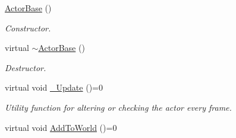 \begin{DoxyCompactItemize}
\item 
\hyperlink{classMezzanine_1_1ActorBase_aa9cc2fce1ff708a96d4a879b87054f18}{Actor\-Base} ()
\begin{DoxyCompactList}\small\item\em Constructor. \end{DoxyCompactList}\item 
virtual \hyperlink{classMezzanine_1_1ActorBase_a0b49f2bc589504c908ccc47a635e1e79}{$\sim$\-Actor\-Base} ()
\begin{DoxyCompactList}\small\item\em Destructor. \end{DoxyCompactList}\item 
virtual void \hyperlink{classMezzanine_1_1ActorBase_a8f5a36a6981f1249dbabab318531afd0}{\-\_\-\-Update} ()=0
\begin{DoxyCompactList}\small\item\em Utility function for altering or checking the actor every frame. \end{DoxyCompactList}\item 
\hypertarget{classMezzanine_1_1ActorBase_abe739a46f248a7ba257becfb560d9aa5}{virtual void \hyperlink{classMezzanine_1_1ActorBase_abe739a46f248a7ba257becfb560d9aa5}{Add\-To\-World} ()=0}\label{classMezzanine_1_1ActorBase_abe739a46f248a7ba257becfb560d9aa5}


\end{DoxyCompactItemize}
